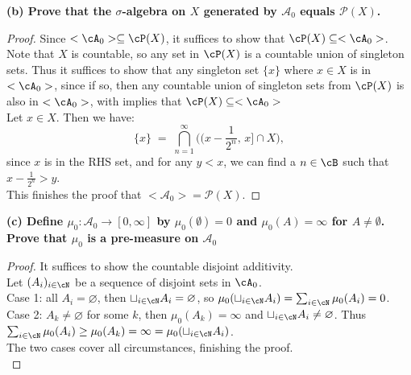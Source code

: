 \documentclass[lang=cn,11pt]{elegantbook}
\begin{document}
\noindent \textbf{(b) Prove that the \(\sigma\)-algebra on \(X\) generated by \(\mathcal{A}_0\) equals \(\mathcal{P}(X)\).}
\begin{proof}
Since $<\cA_0> \sub \cP(X)$, it suffices to show that $\cP(X) \sub <\cA_0>$.
\noindent Note that $X$ is countable, so any set in $\cP(X)$ is a countable union of singleton sets. Thus it suffices to show that any singleton set $\{x\}$ where $x\in X$ is in $<\cA_0>$, since if so, then any countable union of singleton sets from $\cP(X)$ is also in $<\cA_0>$, with implies that $\cP(X) \sub <\cA_0>$\\
\noindent Let $x \in X$. Then we have: 
   \[
     \{x\} \;=\; \bigcap_{n=1}^\infty \bigl( (x - \frac{1}{2^{n}},\,x]\cap X \bigr),
   \]
 since $x$ is in the RHS set, and for any $y <x$, we can find a $n \in \cB$ such that $x - \frac{1}{2^n} > y$.\\
 \noindent This finishes the proof that  \(<\mathcal{A}_0> = \mathcal{P}(X)\).
\end{proof}


\noindent \textbf{(c) Define \(\mu_0 : \mathcal{A}_0 \to [0, \infty]\) by \(\mu_0(\emptyset) = 0\) and \(\mu_0(A) = \infty\) for \(A \neq \emptyset\). Prove that \(\mu_0\) is a pre-measure on \(\mathcal{A}_0\)}
\begin{proof}
It suffices to show the countable disjoint additivity.\\
Let $(A_i)_{i\in\cN}$ be a sequence of disjoint sets in $\cA_0$.\\
Case 1: all $A_i = \varnothing$, then $\sqcup_{i\in \cN} A_i = \varnothing$, so $\mu_0(\sqcup_{i\in \cN} A_i) = \sum_{i\in\cN}\mu_0(A_i) = 0$.\\
Case 2: $A_k \not = \varnothing$ for some $k$, then $\mu_0 (A_k) = \infty$ and $\sqcup_{i\in \cN} A_i \not= \varnothing$. Thus $\sum_{i\in\cN}\mu_0(A_i) \geq \mu_0(A_k)= \infty = \mu_0(\sqcup_{i\in \cN} A_i )$.\\
The two cases cover all circumstances, finishing the proof.\\
\end{proof}
\end{document}
